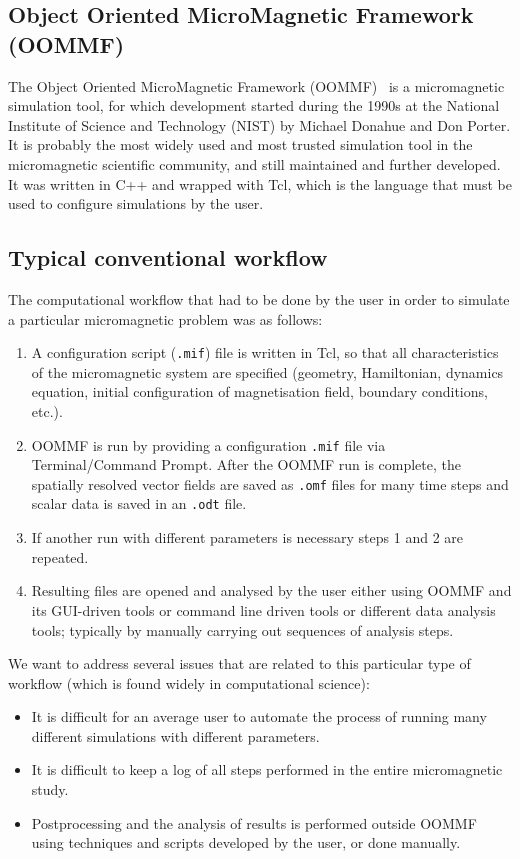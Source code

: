 \documentclass{deliverablereport}
\begin{document}
\subsection{Object Oriented MicroMagnetic Framework (OOMMF)}

The Object Oriented MicroMagnetic Framework (OOMMF)~\cite{Donahue1999}
is a micromagnetic simulation tool, for which development started
during the 1990s at the National Institute of Science and Technology
(NIST) by Michael Donahue and Don Porter. It is probably the most
widely used and most trusted simulation tool in the micromagnetic
scientific community, and still maintained and further developed. It
was written in C++ and wrapped with Tcl, which is the language that
must be used to configure simulations by the user.

\subsection{Typical conventional workflow}

The computational workflow that had to be done by the user in order to simulate a
particular micromagnetic problem was as follows:

\begin{enumerate}
\item A configuration script (\texttt{.mif}) file is written in Tcl,
  so that all characteristics of the micromagnetic system are
  specified (geometry, Hamiltonian, dynamics equation, initial
  configuration of magnetisation field, boundary conditions, etc.).
\item OOMMF is run by providing a configuration \texttt{.mif} file via
  Terminal/Command Prompt. After the OOMMF run is complete, the
  spatially resolved vector fields are saved as \texttt{.omf} files
  for many time steps and scalar data is saved in an \texttt{.odt}
  file.
\item If another run with different parameters is necessary steps 1
  and 2 are repeated.
\item Resulting files are opened and analysed by the user either using
  OOMMF and its GUI-driven tools or command line driven tools or
  different data analysis tools; typically by manually carrying out
  sequences of analysis steps.
\end{enumerate}

We want to address several issues that are related
to this particular type of workflow (which is found widely in
computational science):
\begin{itemize}
\item It is difficult for an average user to automate the process
of running many different simulations with different parameters.
\item It is difficult to keep a log of all steps performed in the
entire micromagnetic study.
\item Postprocessing and the analysis of results is performed outside
OOMMF using techniques and scripts developed by the user, or done manually.
\end{itemize}
\end{document}
